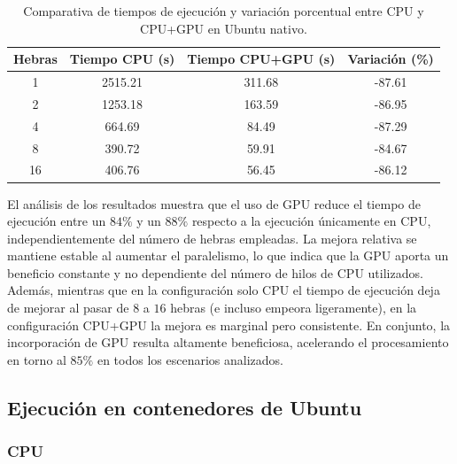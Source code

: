 \begin{table}[ht]
    \centering
    \begin{tabular}{|c|c|c|c|}
        \hline
        \textbf{Hebras} & \textbf{Tiempo CPU (s)} & \textbf{Tiempo CPU+GPU (s)} & \textbf{Variación (\%)} \\
        \hline
        1               & 2515.21                 & 311.68                      & -87.61                  \\
        2               & 1253.18                 & 163.59                      & -86.95                  \\
        4               & 664.69                  & 84.49                       & -87.29                  \\
        8               & 390.72                  & 59.91                       & -84.67                  \\
        16              & 406.76                  & 56.45                       & -86.12                  \\
        \hline
    \end{tabular}
    \caption{Comparativa de tiempos de ejecución y variación porcentual entre CPU y CPU+GPU en Ubuntu nativo.}
    \label{tab:single-node_ubuntu_cpu_vs_gpu_native}
\end{table}

El análisis de los resultados muestra que el uso de GPU reduce el tiempo de ejecución entre un $84\%$ y un $88\%$ respecto a la ejecución únicamente en CPU, independientemente del número de hebras empleadas. La mejora relativa se mantiene estable al aumentar el paralelismo, lo que indica que la GPU aporta un beneficio constante y no dependiente del número de hilos de CPU utilizados. Además, mientras que en la configuración solo CPU el tiempo de ejecución deja de mejorar al pasar de $8$ a $16$ hebras (e incluso empeora ligeramente), en la configuración CPU+GPU la mejora es marginal pero consistente. En conjunto, la incorporación de GPU resulta altamente beneficiosa, acelerando el procesamiento en torno al $85\%$ en todos los escenarios analizados.

\subsection{Ejecución en contenedores de Ubuntu}
\subsubsection{CPU}

